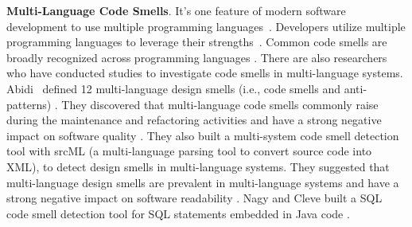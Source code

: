 



{\bf Multi-Language Code Smells}. It's one feature of modern software
development to use multiple programming languages~\cite{723183}. Developers
utilize multiple programming languages to leverage their
strengths~\cite{7476675}.
%
Common code smells are broadly recognized across programming languages
\cite{PMD,CheckStyle,Pysmell,Jscent,DesigniteJava}. There are also researchers
who have conducted studies to investigate code smells in multi-language
systems. Abidi~\etal{} defined 12 multi-language design smells (i.e., code
smells and anti-patterns) \cite{MultiLanguageCodeSmells}. They discovered that
multi-language code smells commonly raise during the maintenance and
refactoring activities and have a strong negative impact on software quality
\cite{Abidi2}. They also built a multi-system code smell detection tool with
srcML (a multi-language parsing tool to convert source code into XML), to
detect design smells in multi-language systems. They suggested that
multi-language design smells are prevalent in multi-language systems and have a
strong negative impact on software readability \cite{Fault-Prone}. Nagy and
Cleve built a SQL code smell detection tool for SQL statements embedded in Java
code \cite{SQLInJava}.
